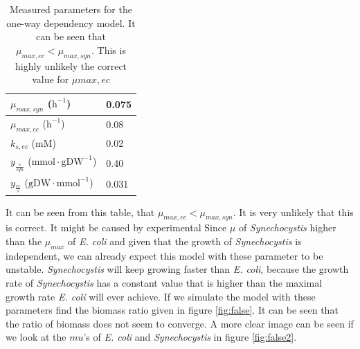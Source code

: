 \documentclass[12pt]{report}
\begin{document}
\begin{table}[!ht]
 \begin{center}  
  \begin{tabular}{|l|l|}
   \hline
   $\mu_{max,syn}$ ($\text{h}^{-1}$) & 0.075 \\ \hline
   $\mu_{max,ec}$ ($\text{h}^{-1}$) & 0.08 \\ \hline
   $k_{s,ec}$ ($\text{mM}$) & 0.02 \\ \hline
   $y_{\frac{s}{syn}}$ ($\text{mmol}\cdot\text{gDW}^{-1}$) & 0.40 \\ \hline
   $y_{\frac{ec}{s}}$ ($\text{gDW}\cdot\text{mmol}^{-1}$) & 0.031 \\
   \hline   
  \end{tabular}
  \caption{Measured parameters for the one-way dependency model. It can be seen that $\mu_{max,ec} < \mu_{max,syn}$. This is highly unlikely the correct value for $\mu{max,ec}$}
  \label{tab:ol}
 \end{center}
\end{table}

It can be seen from this table, that $\mu_{max,ec} < \mu_{max,syn}$. It is very unlikely that this is correct. It might be caused by experimental Since $\mu$ of \textit{Synechocystis} higher than the $\mu_{max}$ of \textit{E. coli} and given that the growth of \textit{Synechocystis} is independent, we can already expect this model with these parameter to be unstable. \textit{Synechocystis} will keep growing faster than \textit{E. coli}, because the growth rate of \textit{Synechocystis} has a constant value that is higher than the maximal growth rate \textit{E. coli} will ever achieve. If we simulate the model with these parameters find the biomass ratio given in figure \ref{fig:false}. It can be seen that the ratio of biomass does not seem to converge. A more clear image can be seen if we look at the $mu$'s of \textit{E. coli} and \textit{Synechocystis} in figure \ref{fig:false2}.
\end{document}
